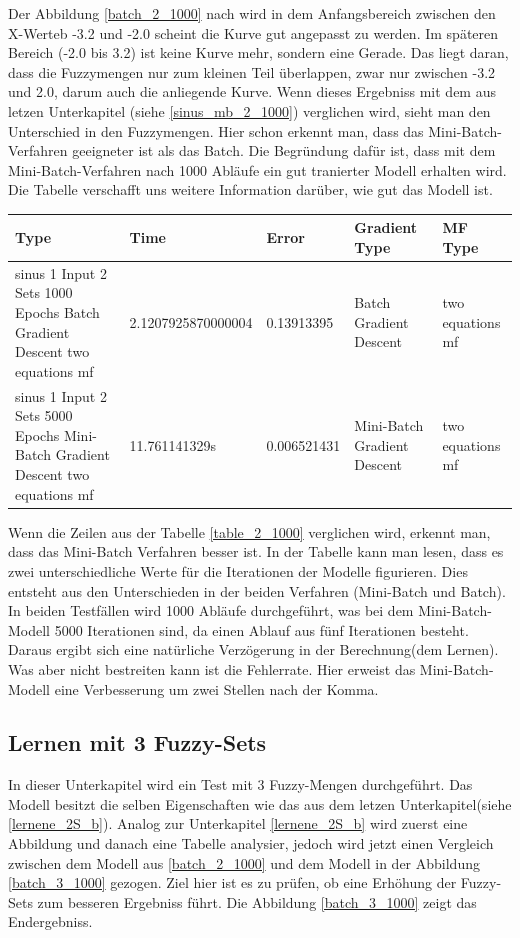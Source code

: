 {Der Abbildung \ref{batch_2_1000} nach wird in dem Anfangsbereich zwischen den X-Werteb -3.2 und -2.0 scheint die Kurve gut angepasst zu werden. Im späteren Bereich (-2.0 bis 3.2) ist keine Kurve mehr, sondern eine Gerade. Das liegt daran, dass die Fuzzymengen nur zum kleinen Teil überlappen, zwar nur zwischen -3.2 und 2.0, darum auch die anliegende Kurve. Wenn dieses Ergebniss mit dem aus letzen Unterkapitel (siehe \ref{sinus_mb_2_1000}) verglichen wird, sieht man den Unterschied in den Fuzzymengen. Hier schon erkennt man, dass das Mini-Batch-Verfahren geeigneter ist als das Batch. Die Begründung dafür ist, dass mit dem Mini-Batch-Verfahren nach 1000 Abläufe ein gut tranierter Modell erhalten wird. Die Tabelle verschafft uns weitere Information darüber, wie gut das Modell ist.
%


\begin{center}
	\begin{minipage}{\textwidth}
	\begin{tabular}{ | p{3cm} | l | l | p{3cm} | p{3cm} |}
		\hline
		Type & Time & Error & Gradient Type & MF Type \\ \hline
		sinus 1 Input 2 Sets 1000 Epochs Batch Gradient Descent two equations mf&2.1207925870000004&0.13913395&Batch Gradient Descent&two equations mf \\ \hline
		sinus 1 Input 2 Sets 5000 Epochs Mini-Batch Gradient Descent two equations mf&11.761141329s&0.006521431&Mini-Batch Gradient Descent&two equations mf \\ \hline
	\end{tabular}
\label{table_2_1000}
\end{minipage}
\end{center}

Wenn die Zeilen aus der Tabelle \ref{table_2_1000} verglichen wird, erkennt man, dass das Mini-Batch Verfahren besser ist. In der Tabelle kann man lesen, dass es zwei unterschiedliche Werte für die Iterationen der Modelle figurieren. Dies entsteht aus den Unterschieden in der beiden Verfahren (Mini-Batch und Batch). In beiden Testfällen wird 1000 Abläufe durchgeführt, was bei dem Mini-Batch-Modell 5000 Iterationen sind, da einen Ablauf aus fünf Iterationen besteht. Daraus ergibt sich eine natürliche Verzögerung in der Berechnung(dem Lernen). Was aber nicht bestreiten kann ist die Fehlerrate. Hier erweist das Mini-Batch-Modell eine Verbesserung um zwei Stellen nach der Komma.

\subsection{Lernen mit 3 Fuzzy-Sets}
In dieser Unterkapitel wird ein Test mit 3 Fuzzy-Mengen durchgeführt. Das Modell besitzt die selben Eigenschaften wie das aus dem letzen Unterkapitel(siehe \ref{lernene_2S_b}). Analog zur Unterkapitel \ref{lernene_2S_b} wird zuerst eine Abbildung und danach eine Tabelle analysier, jedoch wird jetzt einen Vergleich zwischen dem Modell aus \ref{batch_2_1000} und dem Modell in der Abbildung \ref{batch_3_1000} gezogen. Ziel hier ist es zu prüfen, ob eine Erhöhung der Fuzzy-Sets zum besseren Ergebniss führt. Die Abbildung \ref{batch_3_1000} zeigt das Endergebniss.

}
